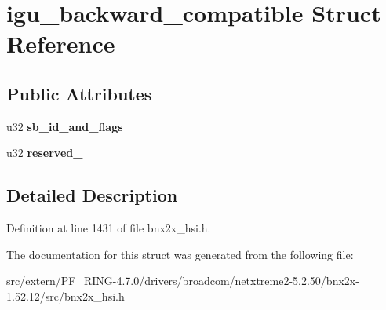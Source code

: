 \hypertarget{structigu__backward__compatible}{
\section{igu\_\-backward\_\-compatible Struct Reference}
\label{structigu__backward__compatible}
}
\subsection*{Public Attributes}
\begin{DoxyCompactItemize}
\item 
\hypertarget{structigu__backward__compatible_a4249db6a48e43e22c6e4dfe7184ad3e8}{
u32 {\bfseries sb\_\-id\_\-and\_\-flags}}
\label{structigu__backward__compatible_a4249db6a48e43e22c6e4dfe7184ad3e8}

\item 
\hypertarget{structigu__backward__compatible_a24daca1e25187537ae13cd8a6adcde5d}{
u32 {\bfseries reserved\_}}
\label{structigu__backward__compatible_a24daca1e25187537ae13cd8a6adcde5d}

\end{DoxyCompactItemize}


\subsection{Detailed Description}


Definition at line 1431 of file bnx2x\_\-hsi.h.



The documentation for this struct was generated from the following file:\begin{DoxyCompactItemize}
\item 
src/extern/PF\_\-RING-\/4.7.0/drivers/broadcom/netxtreme2-\/5.2.50/bnx2x-\/1.52.12/src/bnx2x\_\-hsi.h\end{DoxyCompactItemize}
